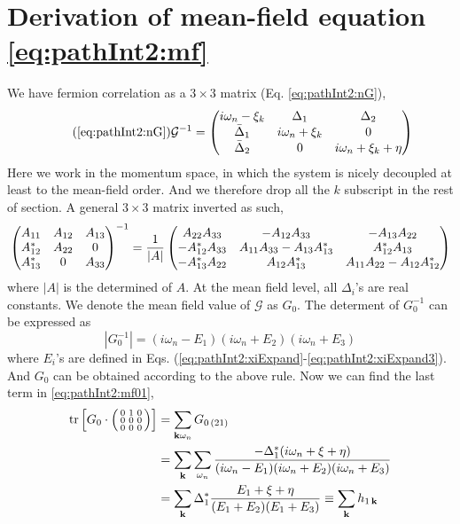 \section{Derivation of  mean-field equation \eqref{eq:pathInt2:mf}\label{sec:pathInt2:deriveMF}}
We have fermion correlation as a $3\times3$ matrix (Eq. \ref{eq:pathInt2:nG}), 
\begin{equation}\tag{\ref{eq:pathInt2:nG}}
\mathcal{G}^{-1}=\begin{pmatrix}
i\omega_{n}-\xi_{k}&\Delta_{1}&\Delta_{2}\\
\bar{\Delta}_{1}&i\omega_{n}+\xi_{k}&0\\
\bar{\Delta}_{2}&0&i\omega_{n}+\xi_{k}+\eta
\end{pmatrix}
\end{equation}
Here we work in the momentum space, in which the system is nicely decoupled at least to the mean-field order.  And we therefore drop all the $k$ subscript in the rest of section. A general $3\times3$ matrix inverted as such, 
  \begin{equation}
  \begin{pmatrix}A_{11}&A_{12}&A_{13}\\A_{12}^{*}&A_{22}&0\\A_{13}^{*}&0&A_{33}\end{pmatrix}^{-1}=
  \frac{1}{|A|}
  \begin{pmatrix}A_{22}A_{33}&-A_{12}A_{33}&-A_{13}A_{22}\\
  	-A_{12}^{*}A_{33}&A_{11}A_{33}-A_{13}A_{13}^{*}&A_{12}^{*}A_{13}\\
	-A_{13}^{*}A_{22}&A_{12}A_{13}^{*}&A_{11}A_{22}-A_{12}A_{12}^{*}\end{pmatrix}
  \end{equation}
where $|A|$ is the determined of $A$.   At the mean field level, all $\Delta_{i}$'s are real constants.  We denote the mean field value of $\mathcal{G}$ as $G_{0}$.  The determent of ${G}_{0}^{-1}$ can be expressed as 
\begin{equation}
|G_{0}^{-1}|=(i\omega_{n}-E_{1})(i\omega_{n}+E_{2})(i\omega_{n}+E_{3})
\end{equation}
where $E_{i}$'s are defined in Eqs. (\ref{eq:pathInt2:xiExpand}-\ref{eq:pathInt2:xiExpand3}).
And $G_{0}$ can be obtained according to the above rule. Now we can find the last term in \ref{eq:pathInt2:mf01}, 
\begin{equation}
\begin{split}
\text{tr}\left[{G_{0}}\cdot\left(\begin{smallmatrix}0&1&0\\0&0&0\\0&0&0\end{smallmatrix}\right)\right]&=\sum_{\mathbf{k}\omega_{n}}G_{0\,(21)}\\
&=\sum_{\mathbf{k}}\sum_{\omega_{n}}\frac{-\Delta_{1}^{*}(i\omega_{n}+\xi+\eta)}{(i\omega_{n}-E_{1})(i\omega_{n}+E_{2})(i\omega_{n}+E_{3})}\\
&=\sum_{\mathbf{k}}\Delta_{1}^{*}\frac{E_{1}+\xi+\eta}{(E_{1}+E_{2})(E_{1}+E_{3})}\equiv\sum_{\mathbf{k}}h_{1\,\mathbf{k}}
\end{split}
\end{equation}
